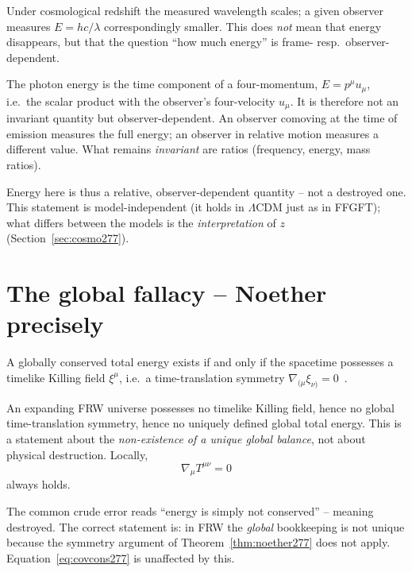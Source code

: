 Under cosmological redshift the measured wavelength scales; a given observer
measures $E = hc/\lambda$ correspondingly smaller. This does \emph{not} mean
that energy disappears, but that the question \enquote{how much energy} is
frame- resp.\ observer-dependent.

\begin{proposition}\label{prop:frame277}
The photon energy is the time component of a four-momentum, $E = p^\mu u_\mu$,
i.e.\ the scalar product with the observer's four-velocity $u_\mu$. It is
therefore not an invariant quantity but observer-dependent. An observer
comoving at the time of emission measures the full energy; an observer in
relative motion measures a different value. What remains \emph{invariant} are
ratios (frequency, energy, mass ratios).
\end{proposition}

Energy here is thus a relative, observer-dependent quantity -- not a destroyed
one. This statement is model-independent (it holds in $\Lambda$CDM just as in
FFGFT); what differs between the models is the \emph{interpretation} of $z$
(Section~\ref{sec:cosmo277}).

\section{The global fallacy -- Noether precisely}

\begin{theorem}
\label{thm:noether277}
A globally conserved total energy exists if and only if the spacetime possesses
a timelike Killing field $\xi^\mu$, i.e.\ a time-translation symmetry
$\nabla_{(\mu}\xi_{\nu)}=0$~\cite{noether1918,wald,mtw}.
\end{theorem}

An expanding FRW universe possesses no timelike Killing field, hence no global
time-translation symmetry, hence no uniquely defined global total energy. This
is a statement about the \emph{non-existence of a unique global balance}, not
about physical destruction. Locally,
\begin{equation}
  \nabla_\mu T^{\mu\nu} = 0
  \label{eq:covcons277}
\end{equation}
always holds.

\begin{remark}
The common crude error reads \enquote{energy is simply not conserved} --
meaning destroyed. The correct statement is: in FRW the \emph{global}
bookkeeping is not unique because the symmetry argument of
Theorem~\ref{thm:noether277} does not apply.
Equation~\eqref{eq:covcons277} is unaffected by this.
\end{remark}

